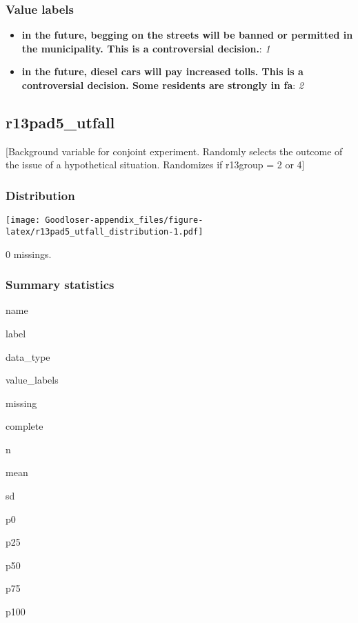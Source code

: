\documentclass[]{book}
\providecommand{\tightlist}{%
  \setlength{\itemsep}{0pt}\setlength{\parskip}{0pt}}
\begin{document}
\subsubsection{Value labels}\label{r13pad5_sak_labels}

\begin{itemize}
\tightlist
\item
  \textbf{in the future, begging on the streets will be banned or
  permitted in the municipality. This is a controversial decision.}:
  \emph{1}
\item
  \textbf{in the future, diesel cars will pay increased tolls. This is a
  controversial decision. Some residents are strongly in fa}: \emph{2}
\end{itemize}

\subsection{r13pad5\_utfall}\label{r13pad5_utfall}

{[}Background variable for conjoint experiment. Randomly selects the
outcome of the issue of a hypothetical situation. Randomizes if r13group
= 2 or 4{]}

\subsubsection{Distribution}\label{r13pad5_utfall_distribution}

\texttt{[image: Goodloser-appendix\_files/figure-latex/r13pad5\_utfall\_distribution-1.pdf]}

0 missings.

\subsubsection{Summary statistics}\label{r13pad5_utfall_summary}

name

label

data\_type

value\_labels

missing

complete

n

mean

sd

p0

p25

p50

p75

p100
\end{document}

